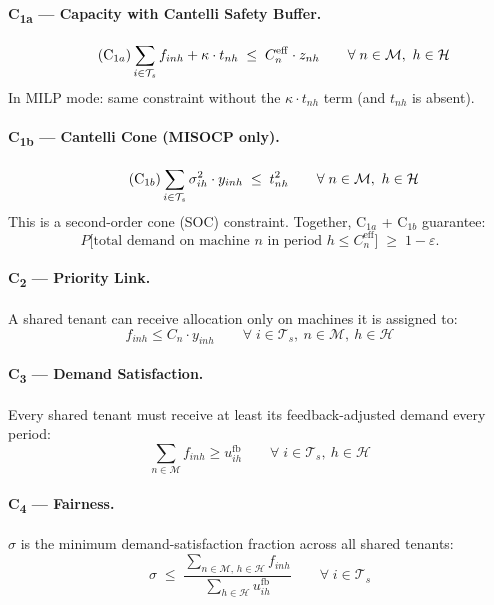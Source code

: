 \documentclass[11pt,a4paper]{article}
\newcommand{\Ts}{\mathcal{T}_s}
\newcommand{\M}{\mathcal{M}}
\newcommand{\PH}{\mathcal{H}}
\newcommand{\Ceff}{C^{\mathrm{eff}}}
\newcommand{\ufb}{u^{\mathrm{fb}}}
\begin{document}
\paragraph{C\textsubscript{1a} --- Capacity with Cantelli Safety Buffer.}
\begin{equation}\tag{C$_{1a}$}
  \sum_{i \in \Ts} f_{inh} + \kappa\cdot t_{nh}
  \;\leq\; \Ceff_n \cdot z_{nh}
  \qquad \forall\; n \in \M,\ h \in \PH
\end{equation}
In MILP mode: same constraint without the $\kappa\cdot t_{nh}$ term (and $t_{nh}$ is absent).

\paragraph{C\textsubscript{1b} --- Cantelli Cone (MISOCP only).}
\begin{equation}\tag{C$_{1b}$}
  \sum_{i \in \Ts} \sigma^2_{ih}\cdot y_{inh}
  \;\leq\; t_{nh}^{2}
  \qquad \forall\; n \in \M,\ h \in \PH
\end{equation}
This is a second-order cone (SOC) constraint. Together, C$_{1a}$ + C$_{1b}$ guarantee:
\[
  P\!\bigl[\text{total demand on machine }n\text{ in period }h \leq \Ceff_n\bigr]
  \;\geq\; 1-\varepsilon.
\]

\paragraph{C\textsubscript{2} --- Priority Link.}
A shared tenant can receive allocation only on machines it is assigned to:
\begin{equation}\tag{C$_2$}
  f_{inh} \leq C_n \cdot y_{inh}
  \qquad \forall\; i \in \Ts,\ n \in \M,\ h \in \PH
\end{equation}

\paragraph{C\textsubscript{3} --- Demand Satisfaction.}
Every shared tenant must receive at least its feedback-adjusted demand every period:
\begin{equation}\tag{C$_3$}
  \sum_{n \in \M} f_{inh} \geq \ufb_{ih}
  \qquad \forall\; i \in \Ts,\ h \in \PH
\end{equation}

\paragraph{C\textsubscript{4} --- Fairness.}
$\sigma$ is the minimum demand-satisfaction fraction across all shared tenants:
\begin{equation}\tag{C$_4$}
  \sigma \;\leq\;
  \frac{\displaystyle\sum_{n \in \M,\,h \in \PH} f_{inh}}
       {\displaystyle\sum_{h \in \PH} \ufb_{ih}}
  \qquad \forall\; i \in \Ts
\end{equation}
\end{document}
